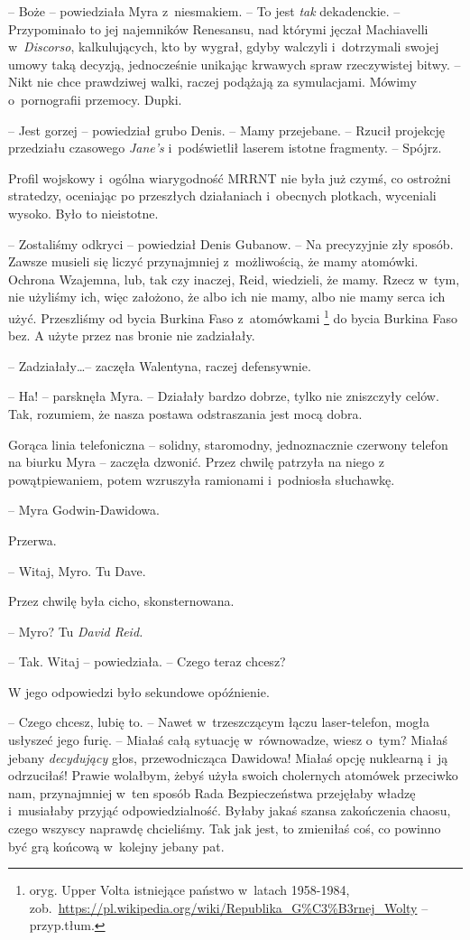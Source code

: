 \documentclass[oneside,polish,11pt,sfheadings]{mwbk}
\begin{document}
-- Boże -- powiedziała Myra z~niesmakiem. -- To jest \textit{tak}
dekadenckie. -- Przypominało to jej najemników Renesansu, nad którymi
jęczał Machiavelli w~\textit{Discorso}, kalkulujących, kto by wygrał,
gdyby walczyli i~dotrzymali swojej umowy taką decyzją, jednocześnie
unikając krwawych spraw rzeczywistej bitwy. -- Nikt nie chce prawdziwej
walki, raczej podążają za symulacjami. Mówimy o~pornografii przemocy.
Dupki.

-- Jest gorzej -- powiedział grubo Denis. -- Mamy przejebane. -- Rzucił
projekcję przedziału czasowego \textit{Jane's} i~podświetlił laserem
istotne fragmenty. -- Spójrz.

Profil wojskowy i~ogólna wiarygodność MRRNT nie była już czymś, co
ostrożni stratedzy, oceniając po przeszłych działaniach i~obecnych
plotkach, wyceniali wysoko. Było to nieistotne.

-- Zostaliśmy odkryci -- powiedział Denis Gubanow. -- Na precyzyjnie zły
sposób. Zawsze musieli się liczyć przynajmniej z~możliwością, że mamy
atomówki. Ochrona Wzajemna, lub, tak czy inaczej, Reid, wiedzieli, że
mamy. Rzecz w~tym, nie użyliśmy ich, więc założono, że albo ich nie
mamy, albo nie mamy serca ich użyć. Przeszliśmy od bycia Burkina Faso z~atomówkami \footnote{ oryg. Upper Volta istniejące państwo w~latach 1958-1984,
zob.~\url{https://pl.wikipedia.org/wiki/Republika\_G\%C3\%B3rnej\_Wolty}
-- przyp.tłum.} do bycia Burkina Faso bez. A użyte przez nas bronie nie
zadziałały.

-- Zadziałały\ldots -- zaczęła Walentyna, raczej defensywnie.

-- Ha! -- parsknęła Myra. -- Działały bardzo dobrze, tylko nie zniszczyły
celów. Tak, rozumiem, że nasza postawa odstraszania jest mocą dobra.

Gorąca linia telefoniczna -- solidny, staromodny, jednoznacznie czerwony
telefon na biurku Myra -- zaczęła dzwonić. Przez chwilę patrzyła na niego
z powątpiewaniem, potem wzruszyła ramionami i~podniosła słuchawkę.

-- Myra Godwin-Dawidowa.

Przerwa.

-- Witaj, Myro. Tu Dave.

Przez chwilę była cicho, skonsternowana.

-- Myro? Tu \textit{David Reid.}

-- Tak. Witaj -- powiedziała. -- Czego teraz chcesz?

W jego odpowiedzi było sekundowe opóźnienie.

-- Czego chcesz, lubię to. -- Nawet w~trzeszczącym łączu
laser-telefon, mogła usłyszeć jego furię. -- Miałaś całą sytuację w~równowadze, wiesz o~tym? Miałaś jebany \textit{decydujący} głos,
przewodnicząca Dawidowa! Miałaś opcję nuklearną i~ją odrzuciłaś! Prawie
wolałbym, żebyś użyła swoich cholernych atomówek przeciwko nam,
przynajmniej w~ten sposób Rada Bezpieczeństwa przejęłaby władzę i~musiałaby przyjąć odpowiedzialność. Byłaby jakaś szansa zakończenia
chaosu, czego wszyscy naprawdę chcieliśmy. Tak jak jest, to zmieniłaś
coś, co powinno być grą końcową w~kolejny jebany pat.
\end{document}
